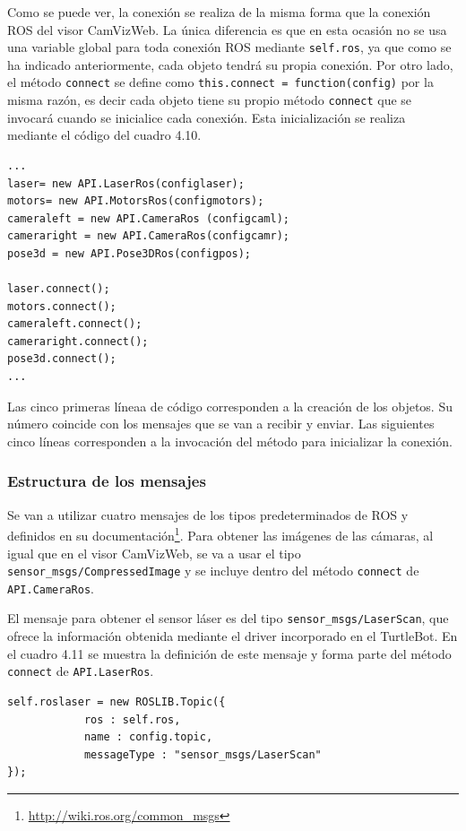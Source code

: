 Como se puede ver, la conexión se realiza de la misma forma que la conexión ROS del visor CamVizWeb. La única diferencia es que en esta ocasión no se usa una variable global para toda conexión ROS mediante \texttt{self.ros}, ya que como se ha indicado anteriormente, cada objeto tendrá su propia conexión. Por otro lado, el método \texttt{connect} se define como \texttt{this.connect = function(config)} por la misma razón, es decir cada objeto tiene su propio método \texttt{connect} que se invocará cuando se inicialice cada conexión. Esta inicialización se realiza mediante el código del cuadro 4.10.

\begin{lstlisting}[caption= Creación de cada uno de los objetos de la \textit{API} y su posterior inicialización, label=cod.objetoapiTurtleBot]
...
laser= new API.LaserRos(configlaser);
motors= new API.MotorsRos(configmotors);
cameraleft = new API.CameraRos (configcaml);
cameraright = new API.CameraRos(configcamr);
pose3d = new API.Pose3DRos(configpos);
    
laser.connect();
motors.connect();
cameraleft.connect();
cameraright.connect();
pose3d.connect();
...
\end{lstlisting}
Las cinco primeras líneaa de código corresponden a la creación de los objetos. Su número coincide con los mensajes que se van a recibir y enviar. Las siguientes cinco líneas corresponden a la invocación del método para inicializar la conexión.

\subsubsection{Estructura de los mensajes}
Se van a utilizar cuatro mensajes de los tipos predeterminados de ROS y definidos en su documentación\footnote{\url{http://wiki.ros.org/common_msgs}}. Para obtener las imágenes de las cámaras, al igual que en el visor CamVizWeb, se va a usar el tipo \texttt{sensor\_msgs/CompressedImage} y se incluye dentro del método \texttt{connect} de \texttt{API.CameraRos}.

El mensaje para obtener el sensor láser es del tipo \texttt{sensor\_msgs/LaserScan}, que ofrece la información obtenida mediante el driver incorporado en el TurtleBot. En el cuadro 4.11 se muestra la definición de este mensaje y forma parte del método \texttt{connect} de \texttt{API.LaserRos}.

\begin{lstlisting}[caption= Definición del mensaje para obtener la información del sensor láser, label=cod.mensajelaserturtle]
self.roslaser = new ROSLIB.Topic({
            ros : self.ros,
            name : config.topic,
            messageType : "sensor_msgs/LaserScan"
});
\end{lstlisting}

